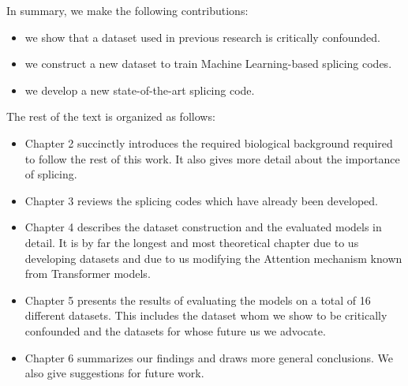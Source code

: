 %
%
%





In summary, we make the following contributions:
\begin{itemize}
	\item we show that a dataset used in previous research is critically confounded.
	\item we construct a new dataset to train Machine Learning-based splicing codes.
	\item we develop a new state-of-the-art splicing code.
\end{itemize}

The rest of the text is organized as follows:
\begin{itemize}
	\item Chapter 2 succinctly introduces the required biological background required to follow the rest of this work. It also gives more detail about the importance of splicing.
	\item Chapter 3 reviews the splicing codes which have already been developed.
	\item Chapter 4 describes the dataset construction and the evaluated models in detail. It is by far the longest and most theoretical chapter due to us developing datasets and due to us modifying the Attention mechanism known from Transformer models.
	\item Chapter 5 presents the results of evaluating the models on a total of 16 different datasets. This includes the dataset whom we show to be critically confounded and the datasets for whose future us we advocate.
	\item Chapter 6 summarizes our findings and draws more general conclusions. We also give suggestions for future work.
\end{itemize}

%
%


